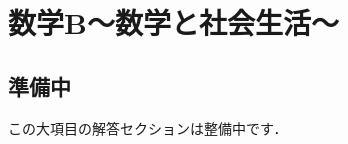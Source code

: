 \documentclass[../../ms_a.tex]{subfiles}
\begin{document}
\section{数学B～数学と社会生活～}

\subsection*{準備中}
この大項目の解答セクションは整備中です．
\end{document}
